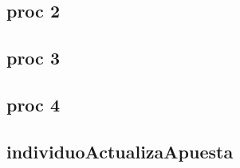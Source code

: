 \documentclass[10pt,a4paper]{article}
\begin{document}


	\label{fig:subfigs}




\subsection{proc 2}
\subsection{proc 3}
\subsection{proc 4}
\subsection{individuoActualizaApuesta}
\end{document}

